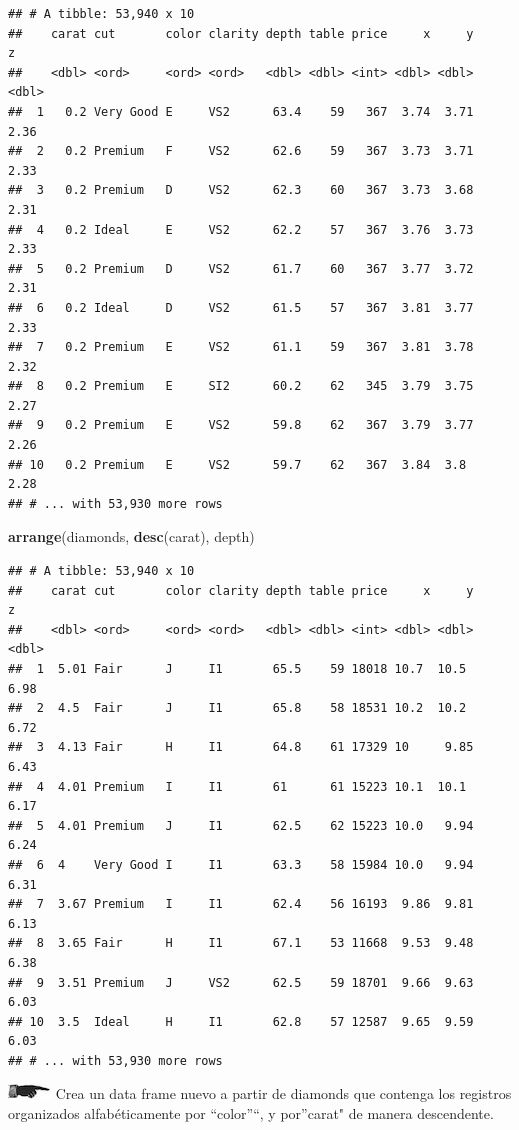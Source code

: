 \documentclass[]{book}
\newenvironment{Shaded}{\begin{snugshade}}{\end{snugshade}}
\newcommand{\KeywordTok}[1]{\textcolor[rgb]{0.13,0.29,0.53}{\textbf{#1}}}
\newcommand{\NormalTok}[1]{#1}
\theoremstyle{definition}
\theoremstyle{definition}
\theoremstyle{definition}
\theoremstyle{remark}
\begin{document}
\begin{verbatim}
## # A tibble: 53,940 x 10
##    carat cut       color clarity depth table price     x     y     z
##    <dbl> <ord>     <ord> <ord>   <dbl> <dbl> <int> <dbl> <dbl> <dbl>
##  1   0.2 Very Good E     VS2      63.4    59   367  3.74  3.71  2.36
##  2   0.2 Premium   F     VS2      62.6    59   367  3.73  3.71  2.33
##  3   0.2 Premium   D     VS2      62.3    60   367  3.73  3.68  2.31
##  4   0.2 Ideal     E     VS2      62.2    57   367  3.76  3.73  2.33
##  5   0.2 Premium   D     VS2      61.7    60   367  3.77  3.72  2.31
##  6   0.2 Ideal     D     VS2      61.5    57   367  3.81  3.77  2.33
##  7   0.2 Premium   E     VS2      61.1    59   367  3.81  3.78  2.32
##  8   0.2 Premium   E     SI2      60.2    62   345  3.79  3.75  2.27
##  9   0.2 Premium   E     VS2      59.8    62   367  3.79  3.77  2.26
## 10   0.2 Premium   E     VS2      59.7    62   367  3.84  3.8   2.28
## # ... with 53,930 more rows
\end{verbatim}

\begin{Shaded}
\begin{Highlighting}[]
\KeywordTok{arrange}\NormalTok{(diamonds, }\KeywordTok{desc}\NormalTok{(carat), depth)}
\end{Highlighting}
\end{Shaded}

\begin{verbatim}
## # A tibble: 53,940 x 10
##    carat cut       color clarity depth table price     x     y     z
##    <dbl> <ord>     <ord> <ord>   <dbl> <dbl> <int> <dbl> <dbl> <dbl>
##  1  5.01 Fair      J     I1       65.5    59 18018 10.7  10.5   6.98
##  2  4.5  Fair      J     I1       65.8    58 18531 10.2  10.2   6.72
##  3  4.13 Fair      H     I1       64.8    61 17329 10     9.85  6.43
##  4  4.01 Premium   I     I1       61      61 15223 10.1  10.1   6.17
##  5  4.01 Premium   J     I1       62.5    62 15223 10.0   9.94  6.24
##  6  4    Very Good I     I1       63.3    58 15984 10.0   9.94  6.31
##  7  3.67 Premium   I     I1       62.4    56 16193  9.86  9.81  6.13
##  8  3.65 Fair      H     I1       67.1    53 11668  9.53  9.48  6.38
##  9  3.51 Premium   J     VS2      62.5    59 18701  9.66  9.63  6.03
## 10  3.5  Ideal     H     I1       62.8    57 12587  9.65  9.59  6.03
## # ... with 53,930 more rows
\end{verbatim}

\includegraphics{./imagenes/manicule2.jpg} Crea un data frame nuevo a
partir de diamonds que contenga los registros organizados
alfabéticamente por ``color''``, y por''carat" de manera descendente.
\end{document}
